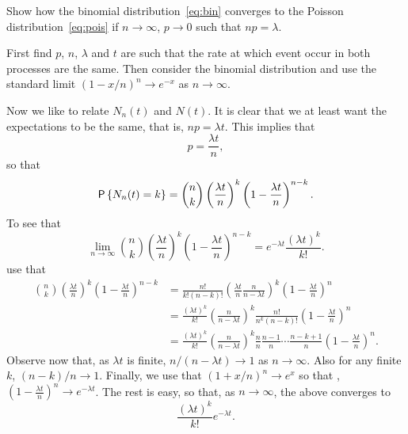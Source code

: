 \begin{exercise}
  Show how the binomial distribution~\eqref{eq:bin} converges to the
  Poisson distribution~\eqref{eq:pois} if $n\to\infty$, $p\to0$ such
  that $np=\lambda$. 
  \begin{hint}
First find $p$, $n$, $\lambda$ and $t$ are such that the rate
    at which event occur in both processes are the same. Then consider
    the binomial distribution and use the standard limit
    $(1-x/n)^n \to e^{-x}$ as $n\to \infty$. 
  \end{hint}
  \begin{solution} Now we like to relate $N_n(t)$ and $N(t)$. It is
    clear that we at least want the expectations to be the same, that
    is, $np = \lambda t$. This implies that
\begin{equation*}
  p = \frac{\lambda t}n,
\end{equation*}
so that 
\begin{equation*}
  \P{N_n(t) = k} = {n \choose k} \left(\frac{\lambda t}{n}\right)^k \left(1-\frac{\lambda t}n\right)^{n-k}.
\end{equation*}
To see that 
\begin{equation*}\label{eq:52}
  \lim_{n\to\infty} {n \choose k} \left(\frac{\lambda t}{n}\right)^k \left(1-\frac{\lambda t}n\right)^{n-k} = e^{-\lambda t} \frac{(\lambda t)^k}{k!}.
\end{equation*}
use that
    \begin{equation*}
      \begin{split}
      {n \choose k} \left(\frac{\lambda t}{n}\right)^k \left(1-\frac{\lambda t}n\right)^{n-k} 
&= \frac{n!}{k!(n-k)!} \left(\frac{\lambda t}{n}\frac{n}{n-\lambda t}\right)^k \left(1-\frac{\lambda t}n\right)^{n} \\
&= \frac{(\lambda t)^k}{k!} \left(\frac n{n-\lambda t} \right)^k  \frac{n!}{n^k(n-k)!}\left(1-\frac{\lambda t}n\right)^{n}\\
&= \frac{(\lambda t)^k}{k!} \left(\frac n{n-\lambda t} \right)^k \frac{n}{n}\frac{n-1}{n}\cdots\frac{n-k+1}{n} \left(1-\frac{\lambda t}n\right)^{n}.
\end{split}
\end{equation*}
Observe now that, as $\lambda t$ is finite, $n/(n-\lambda t)\to 1$ as
$n\to \infty$. Also for any finite $k$, $(n-k)/n\to1$. Finally, we use
that $(1+x/n)^n\to e^{x}$ so that ,
$\left(1-\frac{\lambda t}n\right)^{n} \to e^{-\lambda t}$.  The rest
is easy, so that, as $n\to\infty$,  the above converges to 
\begin{equation*}
\frac{(\lambda t)^k}{k!} e^{-\lambda t}.
\end{equation*}

  \end{solution}
\end{exercise}

